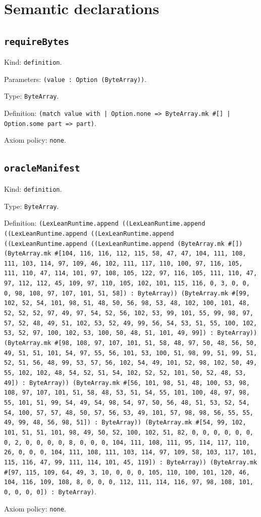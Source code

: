 \documentclass[11pt]{article}
\begin{document}
\section*{Semantic declarations}
\subsection*{\texttt{requireBytes}}
\noindent Kind: \texttt{definition}.\par
\noindent Parameters: \texttt{(value : Option (ByteArray))}.\par
\noindent Type: \texttt{ByteArray}.\par
\noindent Definition: \texttt{(match value with | Option.none => ByteArray.mk \#[] | Option.some part => part)}.\par
\noindent Axiom policy: \texttt{none}.\par
\subsection*{\texttt{oracleManifest}}
\noindent Kind: \texttt{definition}.\par
\noindent Type: \texttt{ByteArray}.\par
\noindent Definition: \texttt{(LexLeanRuntime.append ((LexLeanRuntime.append ((LexLeanRuntime.append ((LexLeanRuntime.append ((LexLeanRuntime.append ((LexLeanRuntime.append (ByteArray.mk \#[]) (ByteArray.mk \#[104, 116, 116, 112, 115, 58, 47, 47, 104, 111, 108, 111, 103, 114, 97, 109, 46, 102, 111, 117, 110, 100, 97, 116, 105, 111, 110, 47, 114, 101, 97, 108, 105, 122, 97, 116, 105, 111, 110, 47, 97, 112, 112, 45, 109, 97, 110, 105, 102, 101, 115, 116, 0, 3, 0, 0, 0, 98, 108, 97, 107, 101, 51, 58]) : ByteArray)) (ByteArray.mk \#[99, 102, 52, 54, 101, 98, 51, 48, 50, 56, 98, 53, 48, 102, 100, 101, 48, 52, 52, 52, 97, 49, 97, 54, 52, 56, 102, 53, 99, 101, 55, 99, 98, 97, 57, 52, 48, 49, 51, 102, 53, 52, 49, 99, 56, 54, 53, 51, 55, 100, 102, 53, 52, 97, 100, 102, 53, 100, 50, 48, 51, 101, 49, 99]) : ByteArray)) (ByteArray.mk \#[98, 108, 97, 107, 101, 51, 58, 48, 97, 50, 48, 56, 50, 49, 51, 51, 101, 54, 97, 55, 56, 101, 53, 100, 51, 98, 99, 51, 99, 51, 52, 51, 56, 48, 99, 53, 57, 56, 102, 54, 49, 101, 52, 98, 102, 50, 49, 55, 102, 102, 48, 54, 52, 51, 54, 102, 52, 52, 101, 50, 52, 48, 53, 49]) : ByteArray)) (ByteArray.mk \#[56, 101, 98, 51, 48, 100, 53, 98, 108, 97, 107, 101, 51, 58, 48, 53, 51, 54, 55, 101, 100, 48, 97, 98, 55, 101, 51, 99, 54, 49, 54, 98, 54, 97, 50, 56, 48, 51, 53, 52, 54, 54, 100, 57, 57, 48, 50, 57, 56, 53, 49, 101, 57, 98, 98, 56, 55, 55, 49, 99, 48, 56, 98, 51]) : ByteArray)) (ByteArray.mk \#[54, 99, 102, 101, 51, 51, 101, 98, 49, 50, 52, 100, 102, 51, 82, 0, 0, 0, 0, 0, 0, 0, 2, 0, 0, 0, 0, 8, 0, 0, 0, 104, 111, 108, 111, 95, 114, 117, 110, 26, 0, 0, 0, 104, 111, 108, 111, 103, 114, 97, 109, 58, 103, 117, 101, 115, 116, 47, 99, 111, 114, 101, 45, 119]) : ByteArray)) (ByteArray.mk \#[97, 115, 109, 64, 49, 3, 10, 0, 0, 0, 105, 110, 100, 101, 120, 46, 104, 116, 109, 108, 8, 0, 0, 0, 112, 111, 114, 116, 97, 98, 108, 101, 0, 0, 0, 0]) : ByteArray)}.\par
\noindent Axiom policy: \texttt{none}.\par
\end{document}
